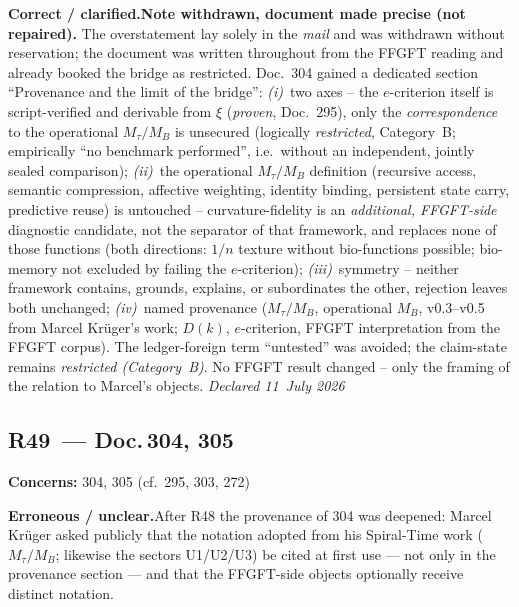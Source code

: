 \smallskip\noindent\textbf{Correct / clarified.}\quad \textbf{Note withdrawn, document made precise (not repaired).} The overstatement lay solely in the \emph{mail} and was withdrawn without reservation; the document was written throughout from the FFGFT reading and already booked the bridge as restricted. Doc.~304 gained a dedicated section \enquote{Provenance and the limit of the bridge}: \emph{(i)}~two axes -- the $e$-criterion itself is script-verified and derivable from $\xi$ (\emph{proven}, Doc.~295), only the \emph{correspondence} to the operational $M_\tau/M_B$ is unsecured (logically \emph{restricted}, Category~B; empirically \enquote{no benchmark performed}, i.e.\ without an independent, jointly sealed comparison); \emph{(ii)}~the operational $M_\tau/M_B$ definition (recursive access, semantic compression, affective weighting, identity binding, persistent state carry, predictive reuse) is untouched -- curvature-fidelity is an \emph{additional, FFGFT-side} diagnostic candidate, not the separator of that framework, and replaces none of those functions (both directions: $1/n$ texture without bio-functions possible; bio-memory not excluded by failing the $e$-criterion); \emph{(iii)}~symmetry -- neither framework contains, grounds, explains, or subordinates the other, rejection leaves both unchanged; \emph{(iv)}~named provenance ($M_\tau/M_B$, operational $M_B$, v0.3--v0.5 from Marcel Krüger's work; $D(k)$, $e$-criterion, FFGFT interpretation from the FFGFT corpus). The ledger-foreign term \enquote{untested} was avoided; the claim-state remains \emph{restricted (Category~B)}. No FFGFT result changed -- only the framing of the relation to Marcel's objects. \emph{Declared 11~July 2026}


\medskip


\subsection*{R49~--- Doc.\,304, 305}

\noindent\textbf{Concerns:} 304, 305 (cf.\ 295, 303, 272)


\smallskip\noindent\textbf{Erroneous / unclear.}\quad After R48 the provenance of 304 was deepened: Marcel Krüger asked publicly that the notation adopted from his Spiral-Time work ($M_\tau/M_B$; likewise the sectors U1/U2/U3) be cited at first use --- not only in the provenance section --- and that the FFGFT-side objects optionally receive distinct notation.



